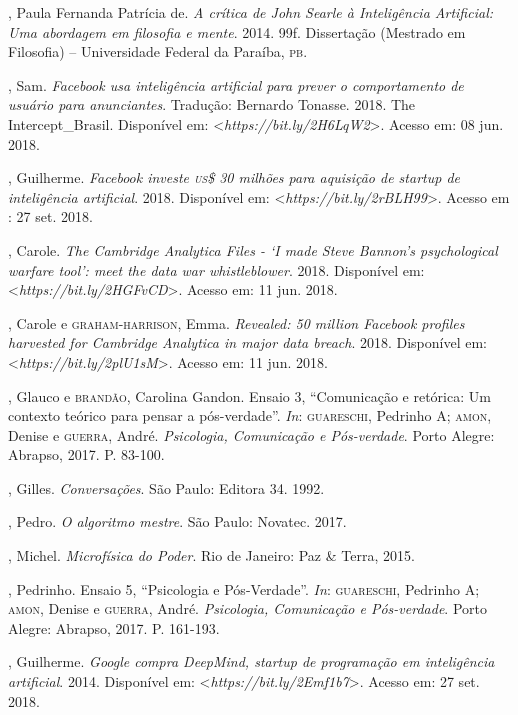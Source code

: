 \begin{bibliohedra}
, Paula Fernanda Patrícia de. \emph{A crítica de John Searle à
Inteligência Artificial: Uma abordagem em filosofia e mente}.
2014. 99f. Dissertação (Mestrado em Filosofia) -- Universidade Federal
da Paraíba, \textsc{pb}.

, Sam. \emph{Facebook usa inteligência artificial para prever o
comportamento de usuário para anunciantes}. Tradução: Bernardo
Tonasse. 2018. The Intercept\_Brasil. Disponível em:
\textless{}\emph{https://bit.ly/2H6LqW2}\textgreater{}. Acesso em: 08 jun. 2018.

, Guilherme. \emph{Facebook investe \textsc{us}\$ 30 milhões para
aquisição de startup de inteligência artificial}. 2018. Disponível em:
\textless{}\emph{https://bit.ly/2rBLH99}\textgreater{}. Acesso em : 27 set. 2018.

, Carole. \emph{The Cambridge Analytica Files - `I made
Steve Bannon's psychological warfare tool': meet the data war
whistleblower}. 2018. Disponível em: \textless{}\emph{https://bit.ly/2HGFvCD}\textgreater{}.
Acesso em: 11 jun. 2018.

, Carole e \textsc{graham-harrison}, Emma. \emph{Revealed: 50 million
Facebook profiles harvested for Cambridge Analytica in major data
breach}. 2018. Disponível em: \textless{}\emph{https://bit.ly/2plU1sM}\textgreater{}. Acesso em: 11 jun. 2018.

, Glauco e \textsc{brandão}, Carolina Gandon. Ensaio 3, ``Comunicação e
retórica: Um contexto teórico para pensar a pós-verdade''. \emph{In}:
\textsc{guareschi}, Pedrinho A; \textsc{amon}, Denise e \textsc{guerra}, André. \emph{Psicologia,
Comunicação e Pós-verdade}. Porto Alegre: Abrapso, 2017. P. 83-100.

, Gilles. \emph{Conversações}. São Paulo: Editora 34. 1992.

, Pedro. \emph{O algoritmo mestre}. São Paulo: Novatec. 2017.

, Michel. \emph{Microfísica do Poder}. Rio de Janeiro: Paz \&
Terra, 2015.

, Pedrinho. Ensaio 5, ``Psicologia e Pós-Verdade''. \emph{In}:
\textsc{guareschi}, Pedrinho A; \textsc{amon}, Denise e \textsc{guerra}, André. \emph{Psicologia,
Comunicação e Pós-verdade}. Porto Alegre: Abrapso, 2017. P. 161-193.

, Guilherme. \emph{Google compra DeepMind, startup de programação
em inteligência artificial}. 2014. Disponível em: \textless{}\emph{https://bit.ly/2Emf1b7}\textgreater{}. Acesso em: 27 set. 2018.


\end{bibliohedra}
